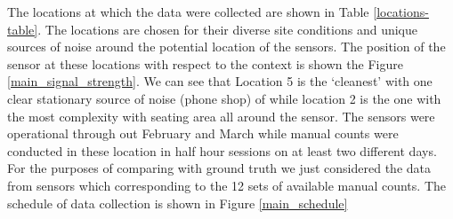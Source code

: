 The locations at which the data were collected are shown in Table \ref{locations-table}. The locations are chosen for their diverse site conditions and unique sources of noise around the potential location of the sensors. The position of the sensor at these locations with respect to the context is shown the Figure \ref{main_signal_strength}. We can see that Location 5 is the `cleanest' with one clear stationary source of noise (phone shop) of while location 2 is the one with the most complexity with seating area all around the sensor. 
The sensors were operational through out February and March while manual counts were conducted in these location in half hour sessions on at least two different days. For the purposes of comparing with ground truth we just considered the data from sensors which corresponding to the 12 sets of available manual counts. The schedule of data collection is shown in Figure \ref{main_schedule}

